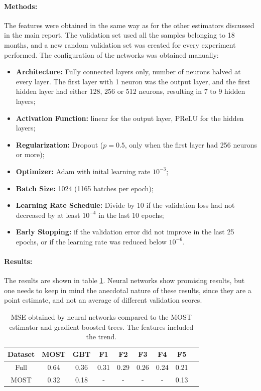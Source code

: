\documentclass[a4paper]{book}
\begin{document}
\paragraph{Methods:}
The features were obtained in the same way as for the other estimators discussed in the main report. The validation set used all the samples belonging to 18 months, and a new random validation set was created for every experiment performed. The configuration of the networks was obtained manually:

\begin{itemize}
\item \textbf{Architecture:} Fully connected layers only, number of neurons halved at every layer. The first layer with 1 neuron was the output layer, and the first hidden layer had either 128, 256 or 512 neurons, resulting in 7 to 9 hidden layers;
\item \textbf{Activation Function:} linear for the output layer, PReLU \citep{prelu} for the hidden layers;
\item \textbf{Regularization:} Dropout ($p=0.5$, only when the first layer had 256 neurons or more);
\item \textbf{Optimizer:} Adam \citep{adam} with inital learning rate $10^{-3}$;
\item \textbf{Batch Size:} 1024 (1165 batches per epoch);
\item \textbf{Learning Rate Schedule:} Divide by 10 if the validation loss had not decreased by at least $10^{-4}$ in the last 10 epochs;
\item \textbf{Early Stopping:} if the validation error did not improve in the last 25 epochs, or if the learning rate was reduced below $10^{-6}$.
\end{itemize}

\paragraph{Results:}
The results are shown in table \ref{tbl:nnets}. Neural networks show promising results, but one needs to keep in mind the anecdotal nature of these results, since they are a point estimate, and not an average of different validation scores.

\begin{table}
\caption{MSE obtained by neural networks compared to the MOST estimator and gradient boosted trees. The features included the trend.}
\label{tbl:nnets}
\centering
\begin{tabular}{ccc|cccccc}
\toprule
\textbf{Dataset} & \textbf{MOST} & \textbf{GBT} & \textbf{F1} & \textbf{F2} & \textbf{F3} & \textbf{F4} & \textbf{F5} \\
\midrule
Full & 0.64 & 0.36 & 0.31 & 0.29 & 0.26 & 0.24 & 0.21 \\
MOST & 0.32 & 0.18 & - & - & - & - & 0.13 \\
\bottomrule
\end{tabular}
\end{table}
\end{document}
